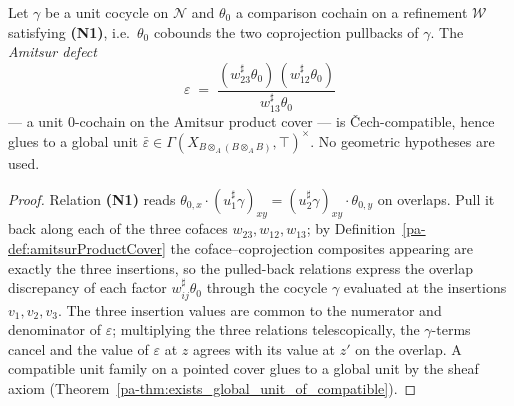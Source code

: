 \begin{theorem}
  \label{pa-thm:exists_glued_productDefect}
  \leanok

  Let \(\gamma\) be a unit cocycle on \(\mathcal N\) and \(\theta_0\) a comparison cochain on a
  refinement \(\mathcal W\) satisfying \textbf{(N1)}, i.e.\ \(\theta_0\) cobounds the two
  coprojection pullbacks of \(\gamma\). The \emph{Amitsur defect}
  \[
    \varepsilon \;=\; \frac{(w_{23}^{\sharp}\theta_0)\,(w_{12}^{\sharp}\theta_0)}
      {w_{13}^{\sharp}\theta_0}
  \]
  --- a unit \(0\)-cochain on the Amitsur product cover --- is \v Cech-compatible, hence glues to a
  global unit \(\bar\varepsilon \in \Gamma(X_{B \otimes_A (B \otimes_A B)}, \top)^{\times}\). No
  geometric hypotheses are used.
\end{theorem}
\begin{proof}
  \leanok
  Relation \textbf{(N1)} reads \(\theta_{0,x} \cdot (u_1^{\sharp}\gamma)_{xy} =
  (u_2^{\sharp}\gamma)_{xy} \cdot \theta_{0,y}\) on overlaps. Pull it back along each of the three
  cofaces \(w_{23}, w_{12}, w_{13}\); by Definition~\ref{pa-def:amitsurProductCover} the
  coface--coprojection composites appearing are exactly the three insertions, so the pulled-back
  relations express the overlap discrepancy of each factor \(w_{ij}^{\sharp}\theta_0\) through the
  cocycle \(\gamma\) evaluated at the insertions \(v_1, v_2, v_3\). The three insertion values are
  common to the numerator and denominator of \(\varepsilon\); multiplying the three relations
  telescopically, the \(\gamma\)-terms cancel and the value of \(\varepsilon\) at \(z\) agrees with
  its value at \(z'\) on the overlap. A compatible unit family on a pointed cover glues to a global
  unit by the sheaf axiom (Theorem~\ref{pa-thm:exists_global_unit_of_compatible}).
\end{proof}

